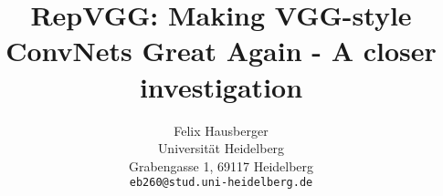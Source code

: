 \documentclass[final]{cvpr}
\begin{document}
\title{RepVGG: Making VGG-style ConvNets Great Again - A closer investigation}

\author{Felix Hausberger\\
	Universität Heidelberg\\
	Grabengasse 1, 69117 Heidelberg\\
	{\tt\small eb260@stud.uni-heidelberg.de}
}

\maketitle






















{\small


}
\end{document}
